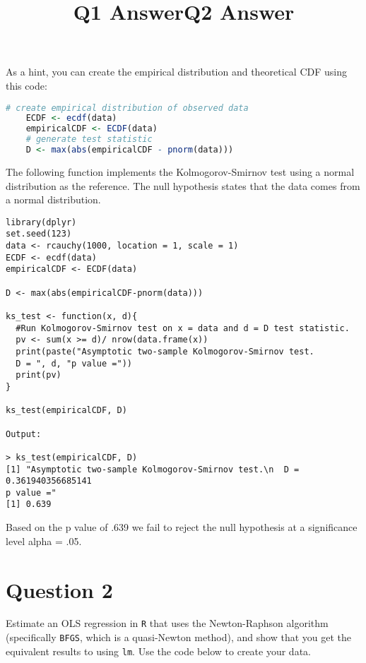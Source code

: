 \documentclass[12pt,letterpaper]{article}
\begin{document}
	
\noindent As a hint, you can create the empirical distribution and theoretical CDF using this code:

\begin{lstlisting}[language=R]
	# create empirical distribution of observed data
	ECDF <- ecdf(data)
	empiricalCDF <- ECDF(data)
	# generate test statistic
	D <- max(abs(empiricalCDF - pnorm(data))) \end{lstlisting}

\vspace{.5in}

\title{Q1 Answer}
\item The following function implements the Kolmogorov-Smirnov test
using a normal distribution as the reference. The null hypothesis states that the data comes from a normal distribution.

\begin{verbatim}
library(dplyr)
set.seed(123)
data <- rcauchy(1000, location = 1, scale = 1)
ECDF <- ecdf(data)
empiricalCDF <- ECDF(data)

D <- max(abs(empiricalCDF-pnorm(data)))

ks_test <- function(x, d){
  #Run Kolmogorov-Smirnov test on x = data and d = D test statistic.
  pv <- sum(x >= d)/ nrow(data.frame(x))
  print(paste("Asymptotic two-sample Kolmogorov-Smirnov test.
  D = ", d, "p value ="))
  print(pv)
}

ks_test(empiricalCDF, D)

Output:

> ks_test(empiricalCDF, D)
[1] "Asymptotic two-sample Kolmogorov-Smirnov test.\n  D =  0.361940356685141 
p value ="
[1] 0.639

\end{verbatim}
Based on the p value of .639 we fail to reject the null hypothesis at a significance level alpha = .05.

\vspace{.5in}
\section*{Question 2}
\noindent Estimate an OLS regression in \texttt{R} that uses the Newton-Raphson algorithm (specifically \texttt{BFGS}, which is a quasi-Newton method), and show that you get the equivalent results to using \texttt{lm}. Use the code below to create your data.
\vspace{.5cm}
 
\vspace{1in}
\title{Q2 Answer}
\end{document}
